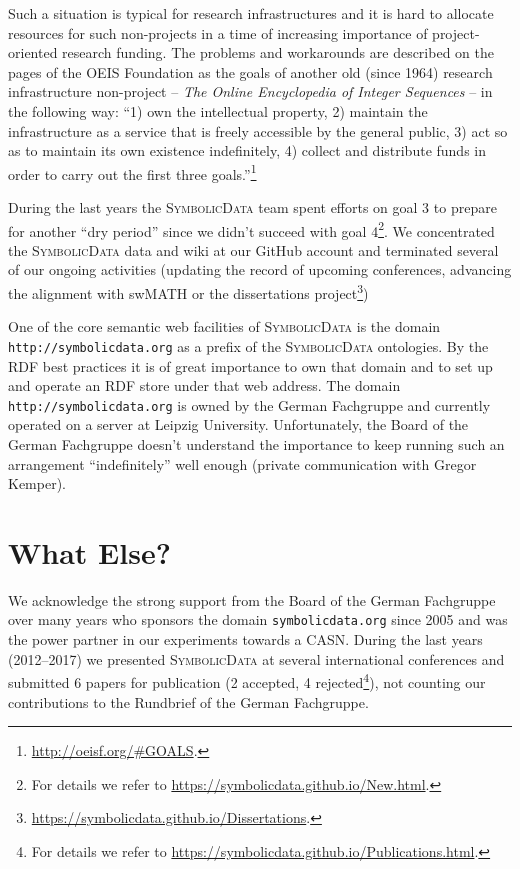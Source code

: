 \documentclass[a4paper,11pt]{article}
\def\SD{\textsc{SymbolicData}}
\begin{document}
Such a situation is typical for research infrastructures and it is hard to
allocate resources for such non-projects in a time of increasing importance of
project-oriented research funding.  The problems and workarounds are described
on the pages of the OEIS Foundation as the goals of another old (since 1964)
research infrastructure non-project -- \emph{The Online Encyclopedia of Integer
  Sequences} -- in the following way: ``1) own the intellectual property, 2)
maintain the infrastructure as a service that is freely accessible by the
general public, 3) act so as to maintain its own existence indefinitely, 4)
collect and distribute funds in order to carry out the first three
goals.''\footnote{\url{http://oeisf.org/\#GOALS}.}

During the last years the {\SD} team spent efforts on goal 3 to prepare for
another ``dry period'' since we didn't succeed with goal 4\footnote{For details
  we refer to \url{https://symbolicdata.github.io/New.html}.}.  We concentrated
the {\SD} data and wiki at our GitHub account and terminated several of our
ongoing activities (updating the record of upcoming conferences, advancing the
alignment with swMATH or the dissertations
project\footnote{\url{https://symbolicdata.github.io/Dissertations}.})

One of the core semantic web facilities of {\SD} is the domain
\texttt{http://symbolicdata.org} as a prefix of the {\SD} ontologies.  By the
RDF best practices it is of great importance to own that domain and to set up
and operate an RDF store under that web address.  The domain
\texttt{http://symbolicdata.org} is owned by the German Fachgruppe and
currently operated on a server at Leipzig University.  Unfortunately, the Board
of the German Fachgruppe doesn't understand the importance to keep running such
an arrangement ``indefinitely'' well enough (private communication with Gregor
Kemper).

\section{What Else?}

We acknowledge the strong support from the Board of the German Fachgruppe over
many years who sponsors the domain \texttt{symbolicdata.org} since 2005 and was
the power partner in our experiments towards a CASN. During the last years
(2012--2017) we presented {\SD} at several international conferences and
submitted 6 papers for publication (2 accepted, 4 rejected\footnote{For details
  we refer to \url{https://symbolicdata.github.io/Publications.html}.}), not
counting our contributions to the Rundbrief of the German Fachgruppe.
\end{document}
